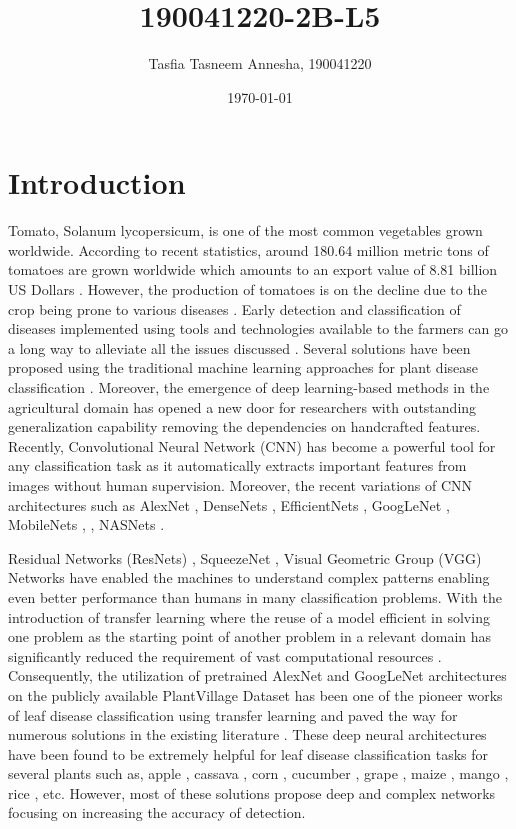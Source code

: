 \documentclass[a4paper,10pt]{article}
\title{190041220-2B-L5}
\author{Tasfia Tasneem Annesha, 190041220}
\date{\today}
\begin{document}
\maketitle

\section{Introduction}
Tomato, Solanum lycopersicum, is one of the most common vegetables grown worldwide. According to recent statistics, around 180.64 million metric tons of tomatoes are grown worldwide which amounts to an export value of 8.81 billion US Dollars \cite{1}. However, the production of tomatoes is on the decline due to the crop being prone to various diseases \cite{2}.
Early detection and classification of diseases implemented using tools and technologies available
to the farmers can go a long way to alleviate all the issues discussed \cite{3}.
Several solutions have been proposed using the traditional machine learning approaches for plant disease classification \cite{4}. Moreover, the emergence of deep learning-based methods in the agricultural domain has opened a new door
for researchers with outstanding generalization capability removing the dependencies on handcrafted features\cite{5}.
Recently, Convolutional Neural Network (CNN) has become a powerful tool for any classification task as it automatically extracts important features from images without human
supervision. Moreover, the recent variations of CNN architectures such as AlexNet \cite{6}, DenseNets \cite{7}, EfficientNets \cite{8}, GoogLeNet \cite{9}, MobileNets \cite{10}, \cite{11}, NASNets \cite{12}.

Residual Networks (ResNets) \cite{13}, SqueezeNet \cite{14}, Visual
Geometric Group (VGG) Networks \cite{15} have enabled the machines to understand complex patterns enabling even better performance than humans in many classification
problems. With the introduction of transfer learning where the reuse of a model efficient in solving one problem as the starting point of another problem in a relevant domain has significantly reduced the requirement of vast computational resources \cite{16}. Consequently, the utilization of pretrained AlexNet and GoogLeNet architectures on the publicly available PlantVillage Dataset \cite{17} has been one of the pioneer works of leaf disease classification using transfer learning and paved the way for numerous solutions in the existing literature \cite{18}. These deep neural architectures have been found to be extremely helpful for leaf disease classification tasks for several plants such as, apple \cite{19}, cassava \cite{20},
corn \cite{21}, cucumber \cite{22}, grape \cite{23}, maize \cite{24}, mango \cite{25},
rice \cite{26}, etc. However, most of these solutions propose deep and complex networks focusing on increasing the accuracy of
detection.
\end{document}
